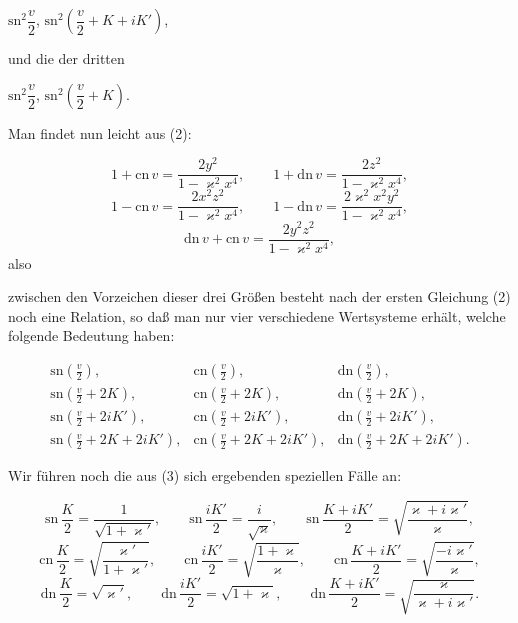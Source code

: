 
$\mathrm{sn}^2\dfrac{v}{2}$, \quad $\mathrm{sn}^2\left(\dfrac{v}{2}+K+iK'\right)$,

und die der dritten

$\mathrm{sn}^2\dfrac{v}{2}$, \quad $\mathrm{sn}^2\left(\dfrac{v}{2}+K\right)$.

Man findet nun leicht aus (2):

\[
1+\mathrm{cn}\,v = \frac{2y^2}{1-\varkappa^2x^4}, \qquad 1+\mathrm{dn}\,v = \frac{2z^2}{1-\varkappa^2x^4},
\]
\[
1-\mathrm{cn}\,v = \frac{2x^2z^2}{1-\varkappa^2x^4}, \qquad 1-\mathrm{dn}\,v = \frac{2\varkappa^2x^2y^2}{1-\varkappa^2x^4},
\]
\[
\mathrm{dn}\,v+\mathrm{cn}\,v = \frac{2y^2z^2}{1-\varkappa^2x^4},
\]
also


zwischen den Vorzeichen dieser drei Größen besteht nach der
ersten Gleichung (2) noch eine Relation, so daß man nur vier
verschiedene Wertsysteme erhält, welche folgende Bedeutung haben:

\[
\begin{array}{ccc}
\mathrm{sn}\left(\frac{v}{2}\right), & \mathrm{cn}\left(\frac{v}{2}\right), & \mathrm{dn}\left(\frac{v}{2}\right),\\
\mathrm{sn}\left(\frac{v}{2}+2K\right), & \mathrm{cn}\left(\frac{v}{2}+2K\right), & \mathrm{dn}\left(\frac{v}{2}+2K\right),\\
\mathrm{sn}\left(\frac{v}{2}+2iK'\right), & \mathrm{cn}\left(\frac{v}{2}+2iK'\right), & \mathrm{dn}\left(\frac{v}{2}+2iK'\right),\\
\mathrm{sn}\left(\frac{v}{2}+2K+2iK'\right), & \mathrm{cn}\left(\frac{v}{2}+2K+2iK'\right), & \mathrm{dn}\left(\frac{v}{2}+2K+2iK'\right).
\end{array}
\]

Wir führen noch die aus (3) sich ergebenden speziellen
Fälle an:

\[
\mathrm{sn}\,\frac{K}{2} = \frac{1}{\sqrt{1+\varkappa'}}, \qquad
\mathrm{sn}\,\frac{iK'}{2} = \frac{i}{\sqrt{\varkappa}}, \qquad
\mathrm{sn}\,\frac{K+iK'}{2} = \sqrt{\frac{\varkappa+i\varkappa'}{\varkappa}},
\]
\[
\mathrm{cn}\,\frac{K}{2} = \sqrt{\frac{\varkappa'}{1+\varkappa'}}, \qquad
\mathrm{cn}\,\frac{iK'}{2} = \sqrt{\frac{1+\varkappa}{\varkappa}}, \qquad
\mathrm{cn}\,\frac{K+iK'}{2} = \sqrt{\frac{-i\varkappa'}{\varkappa}},
\]
\[
\mathrm{dn}\,\frac{K}{2} = \sqrt{\varkappa'}, \qquad
\mathrm{dn}\,\frac{iK'}{2} = \sqrt{1+\varkappa}, \qquad
\mathrm{dn}\,\frac{K+iK'}{2} = \sqrt{\frac{\varkappa}{\varkappa+i\varkappa'}}.
\]

